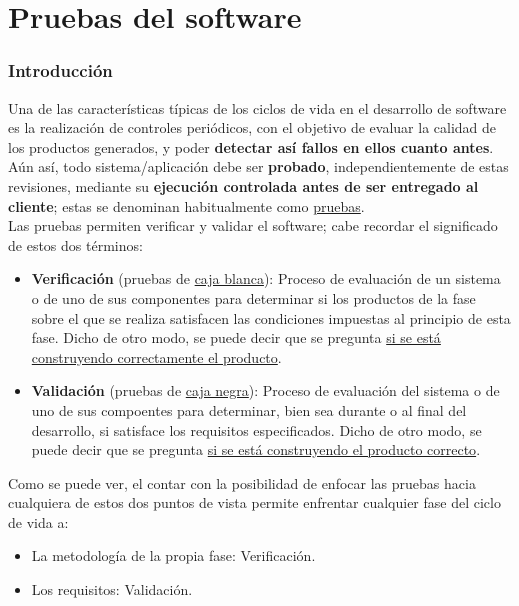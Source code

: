 \part{Pruebas del software}

\section{Introducción}

Una de las características típicas de los ciclos de vida en el desarrollo de software es la realización de controles periódicos, con el objetivo de evaluar la calidad de los productos generados, y poder \textbf{detectar así fallos en ellos cuanto antes}. Aún así, todo sistema/aplicación debe ser \textbf{probado}, independientemente de estas revisiones, mediante su \textbf{ejecución controlada antes de ser entregado al cliente}; estas se denominan habitualmente como \uline{pruebas}.\\

Las pruebas permiten verificar y validar el software; cabe recordar el significado de estos dos términos:

\begin{itemize}
    \item \textbf{Verificación} (pruebas de \uline{caja blanca}): Proceso de evaluación de un sistema o de uno de sus componentes para determinar si los productos de la fase sobre el que se realiza satisfacen las condiciones impuestas al principio de esta fase. Dicho de otro modo, se puede decir que se pregunta \uline{si se está construyendo correctamente el producto}.
    
    \item \textbf{Validación} (pruebas de \uline{caja negra}): Proceso de evaluación del sistema o de uno de sus compoentes para determinar, bien sea durante o al final del desarrollo, si satisface los requisitos especificados. Dicho de otro modo, se puede decir que se pregunta \uline{si se está construyendo el producto correcto}.
\end{itemize}

Como se puede ver, el contar con la posibilidad de enfocar las pruebas hacia cualquiera de estos dos puntos de vista permite enfrentar cualquier fase del ciclo de vida a:

\begin{itemize}
    \item La metodología de la propia fase: Verificación.
    \item Los requisitos: Validación.
\end{itemize}

